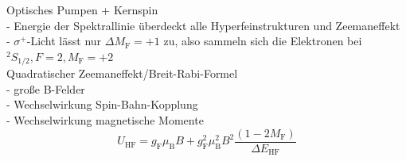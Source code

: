 Optisches Pumpen + Kernspin\\
- Energie der Spektrallinie überdeckt alle Hyperfeinstrukturen und Zeemaneffekt\\
- $\sigma^{+}$-Licht lässt nur $\Delta M_{\text{F}}= +1$ zu, also sammeln sich die Elektronen bei $^{2}S_{1/2}, F=2, M_{\text{F}}=+2$ \\

Quadratischer Zeemaneffekt/Breit-Rabi-Formel\\
- große B-Felder\\
- Wechselwirkung Spin-Bahn-Kopplung\\
- Wechselwirkung magnetische Momente\\
\begin{equation}
U_{\text{HF}}= g_{\text{F}} \mu_{\text{B}} B + g_{\text{F}}^2 \mu_{\text{B}}^2 B^2 \frac{(1- 2M_{\text{F}})}{\Delta E_{\text{HF}}}
\label{eqn:quadzeeman}
\end{equation}

